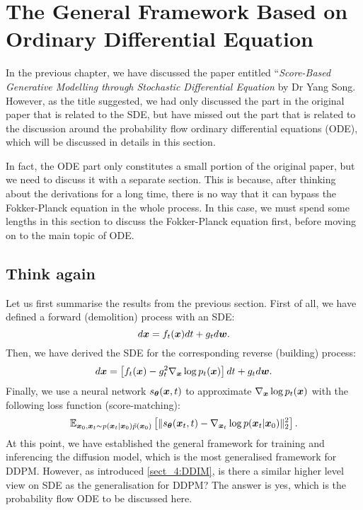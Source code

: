 \section{The General Framework Based on Ordinary Differential Equation}

In the previous chapter, we have discussed the paper entitled ``\emph{Score-Based Generative Modelling through Stochastic Differential Equation} by Dr Yang Song\cite{song2020score}. However, as the title suggested, we had only discussed the part in the original paper that is related to the SDE, but have missed out the part that is related to the discussion around the probability flow ordinary differential equations (ODE), which will be discussed in details in this section.

In fact, the ODE part only constitutes a small portion of the original paper, but we need to discuss it with a separate section. This is because, after thinking about the derivations for a long time, there is no way that it can bypass the Fokker-Planck equation in the whole process. In this case, we must spend some lengths in this section to discuss the Fokker-Planck equation first, before moving on to the main topic of ODE.

\subsection{Think again}
Let us first summarise the results from the previous section. First of all, we have defined a forward (demolition) process with an SDE:
\begin{equation}
    \label{eq:6.1}
    d\bm{x} =f_t(\bm{x})dt+g_t d\bm{w}.
\end{equation}
Then, we have derived the SDE for the corresponding reverse (building) process:
\begin{equation}
    \label{eq:6.2}
    d\bm{x}=\left[ f_t(\bm{x}) -g_t^2\nabla_{\bm{x}}\log p_t(\bm{x}) \right]dt +g_t d\bm{w}.
\end{equation}
Finally, we use a neural network $s_{\bm{\theta}}(\bm{x},t)$ to approximate $\nabla_{\bm{x}} \log p_{t}(\bm{x})$ with the following loss function (score-matching):
\begin{equation}
    \label{eq:6.3}
    \mathbb{E}_{\bm{x}_0,\bm{x}_{t}\sim p(\bm{x}_{t}|\bm{x}_0)\tilde{p}(\bm{x}_0)}\left[\| s_{\bm{\theta}}(\bm{x}_{t},t) - \nabla_{\bm{x}_t}\log p(\bm{x}_{t}|\bm{x}_0)\|_2^2 \right].
\end{equation}
At this point, we have established the general framework for training and inferencing the diffusion model, which is the most generalised framework for DDPM. However, as introduced \cref{sect_4:DDIM}, is there a similar higher level view on SDE as the generalisation for DDPM? The answer is yes, which is the probability flow ODE to be discussed here.

